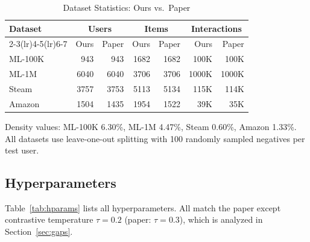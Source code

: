 \documentclass[10pt,twocolumn]{article}
\begin{document}
\begin{table}[H]
\centering
\caption{Dataset Statistics: Ours vs.\ Paper}
\label{tab:datasets}
\setlength{\tabcolsep}{3pt}
\footnotesize
\begin{tabular}{lrrrrrr}
\toprule
\multirow{2}{*}{\textbf{Dataset}}
  & \multicolumn{2}{c}{\textbf{Users}}
  & \multicolumn{2}{c}{\textbf{Items}}
  & \multicolumn{2}{c}{\textbf{Interactions}} \\
\cmidrule(lr){2-3}\cmidrule(lr){4-5}\cmidrule(lr){6-7}
  & Ours & Paper & Ours & Paper & Ours & Paper \\
\midrule
ML-100K
  & 943  & 943
  & 1682 & 1682
  & 100K & 100K \\
ML-1M
  & 6040 & 6040
  & 3706 & 3706
  & 1000K & 1000K \\
Steam
  & 3757 & 3753
  & 5113 & 5134
  & 115K & 114K \\
Amazon
  & 1504 & 1435
  & 1954 & 1522
  & 39K  & 35K \\
\bottomrule
\end{tabular}
\end{table}

Density values: ML-100K 6.30\%, ML-1M 4.47\%, Steam 0.60\%, Amazon
1.33\%. All datasets use leave-one-out splitting with 100 randomly
sampled negatives per test user.

\subsection{Hyperparameters}

Table~\ref{tab:hparams} lists all hyperparameters. All match the paper
except contrastive temperature $\tau = 0.2$ (paper: $\tau = 0.3$),
which is analyzed in Section~\ref{sec:gaps}.
\end{document}
